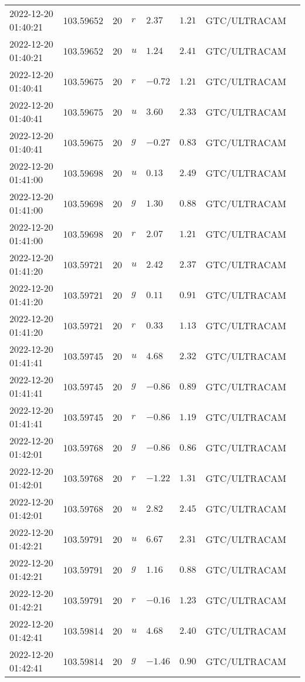\documentclass{nature_plusfigure}
\begin{document}
\begin{supplement}
\begin{center}
\begin{longtable}{llllllll}
2022-12-20 01:40:21 & 103.59652 & 20 & $r$ & $2.37$ & $1.21$ & GTC/ULTRACAM &  \\ 
2022-12-20 01:40:21 & 103.59652 & 20 & $u$ & $1.24$ & $2.41$ & GTC/ULTRACAM &  \\ 
2022-12-20 01:40:41 & 103.59675 & 20 & $r$ & $-0.72$ & $1.21$ & GTC/ULTRACAM &  \\ 
2022-12-20 01:40:41 & 103.59675 & 20 & $u$ & $3.60$ & $2.33$ & GTC/ULTRACAM &  \\ 
2022-12-20 01:40:41 & 103.59675 & 20 & $g$ & $-0.27$ & $0.83$ & GTC/ULTRACAM &  \\ 
2022-12-20 01:41:00 & 103.59698 & 20 & $u$ & $0.13$ & $2.49$ & GTC/ULTRACAM &  \\ 
2022-12-20 01:41:00 & 103.59698 & 20 & $g$ & $1.30$ & $0.88$ & GTC/ULTRACAM &  \\ 
2022-12-20 01:41:00 & 103.59698 & 20 & $r$ & $2.07$ & $1.21$ & GTC/ULTRACAM &  \\ 
2022-12-20 01:41:20 & 103.59721 & 20 & $u$ & $2.42$ & $2.37$ & GTC/ULTRACAM &  \\ 
2022-12-20 01:41:20 & 103.59721 & 20 & $g$ & $0.11$ & $0.91$ & GTC/ULTRACAM &  \\ 
2022-12-20 01:41:20 & 103.59721 & 20 & $r$ & $0.33$ & $1.13$ & GTC/ULTRACAM &  \\ 
2022-12-20 01:41:41 & 103.59745 & 20 & $u$ & $4.68$ & $2.32$ & GTC/ULTRACAM &  \\ 
2022-12-20 01:41:41 & 103.59745 & 20 & $g$ & $-0.86$ & $0.89$ & GTC/ULTRACAM &  \\ 
2022-12-20 01:41:41 & 103.59745 & 20 & $r$ & $-0.86$ & $1.19$ & GTC/ULTRACAM &  \\ 
2022-12-20 01:42:01 & 103.59768 & 20 & $g$ & $-0.86$ & $0.86$ & GTC/ULTRACAM &  \\ 
2022-12-20 01:42:01 & 103.59768 & 20 & $r$ & $-1.22$ & $1.31$ & GTC/ULTRACAM &  \\ 
2022-12-20 01:42:01 & 103.59768 & 20 & $u$ & $2.82$ & $2.45$ & GTC/ULTRACAM &  \\ 
2022-12-20 01:42:21 & 103.59791 & 20 & $u$ & $6.67$ & $2.31$ & GTC/ULTRACAM &  \\ 
2022-12-20 01:42:21 & 103.59791 & 20 & $g$ & $1.16$ & $0.88$ & GTC/ULTRACAM &  \\ 
2022-12-20 01:42:21 & 103.59791 & 20 & $r$ & $-0.16$ & $1.23$ & GTC/ULTRACAM &  \\ 
2022-12-20 01:42:41 & 103.59814 & 20 & $u$ & $4.68$ & $2.40$ & GTC/ULTRACAM &  \\ 
2022-12-20 01:42:41 & 103.59814 & 20 & $g$ & $-1.46$ & $0.90$ & GTC/ULTRACAM &  \\ 

\end{longtable}
\end{center}
\end{supplement}
\end{document}
